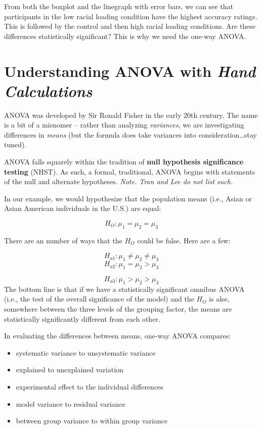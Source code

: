 \documentclass[
  english,
]{book}
\providecommand{\tightlist}{%
  \setlength{\itemsep}{0pt}\setlength{\parskip}{0pt}}
\begin{document}
From both the boxplot and the linegraph with error bars, we can see that participants in the low racial loading condition have the highest accuracy ratings. This is followed by the control and then high racial loading conditions. Are these differences statistically significant? This is why we need the one-way ANOVA.

\hypertarget{understanding-anova-with-hand-calculations}{%
\section{\texorpdfstring{Understanding ANOVA with \emph{Hand Calculations}}{Understanding ANOVA with Hand Calculations}}\label{understanding-anova-with-hand-calculations}}

ANOVA was developed by Sir Ronald Fisher in the early 20th century. The name is a bit of a misnomer -- rather than analyzing \emph{variances}, we are investigating differences in \emph{means} (but the formula does take variances into consideration\ldots stay tuned).

ANOVA falls squarely within the tradition of \textbf{null hypothesis significance testing} (NHST). As such, a formal, traditional, ANOVA begins with statements of the null and alternate hypotheses. \emph{Note. Tran and Lee \citeyearpar{tran_you_2014} do not list such.}

In our example, we would hypothesize that the population means (i.e., Asian or Asian American individuals in the U.S.) are equal:

\[H_{O}:  \mu _{1} = \mu _{2} = \mu _{3}\]

There are an number of ways that the \(H_{O}\) could be false. Here are a few:

\[H_{a1}:  \mu _{1} \neq \mu _{2} \neq \mu _{3}\]
\[H_{a2}:  \mu _{1} =  \mu _{2} > \mu _{3}\]

\[H_{a3}:  \mu _{1} >  \mu _{2} > \mu _{3}\]
The bottom line is that if we have a statistically significant omnibus ANOVA (i.e., the test of the overall significance of the model) and the \(H_{O}\) is alse, somewhere between the three levels of the grouping factor, the means are statistically significantly different from each other.

In evaluating the differences between means, one-way ANOVA compares:

\begin{itemize}
\tightlist
\item
  systematic variance to unsystematic variance
\item
  explained to unexplained variation
\item
  experimental effect to the individual differences
\item
  model variance to residual variance
\item
  between group variance to within group variance
\end{itemize}
\end{document}
